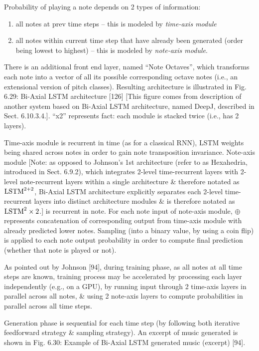 \documentclass{article}
\begin{document}
\begin{itemize}
\begin{itemize}
\begin{itemize}
			Probability of playing a note depends on 2 types of information:
			\begin{enumerate}
				\item all notes at prev time steps -- this is modeled by {\it time-axis module}
				\item all notes within current time step that have already been generated (order being lowest to highest) -- this is modeled by {\it note-axis module}.
			\end{enumerate}
			There is an additional front end layer, named ``Note Octaves'', which transforms each note into a vector of all its possible corresponding octave notes (i.e., an extensional version of pitch classes). Resulting architecture is illustrated in {\sf Fig. 6.29: Bi-Axial LSTM architecture [126]} [This figure comes from description of another system based on Bi-Axial LSTM architecture, named DeepJ, described in Sect. 6.10.3.4.]. ``x2'' represents fact: each module is stacked twice (i.e., has 2 layers).
			
			Time-axis module is recurrent in time (as for a classical RNN), LSTM weights being shared across notes in order to gain note transposition invariance. Note-axis module [Note: as opposed to {\sc Johnson}'s 1st architecture (refer to as Hexahedria, introduced in Sect. 6.9.2), which integrates 2-level time-recurrent layers with 2-level note-recurrent layers within a single architecture \& therefore notated as ${\rm LSTM}^{2+2}$, Bi-Axial LSTM architecture explicitly separates each 2-level time-recurrent layers into distinct architecture modules \& is therefore notated as ${\rm LSTM}^2\times2$.] is recurrent in note. For each note input of note-axis module, $\oplus$ represents concatenation of corresponding output from time-axis module with already predicted lower notes. Sampling (into a binary value, by using a coin flip) is applied to each note output probability in order to compute final prediction (whether that note is played or not).
			
			As pointed out by Johnson [94], during training phase, as all notes at all time steps are known, training process may be accelerated by processing each layer independently (e.g., on a GPU), by running input through 2 time-axis layers in parallel across all notes, \& using 2 note-axis layers to compute probabilities in parallel across all time steps.
			
			Generation phase is sequential for each time step (by following both iterative feedforward strategy \& sampling strategy). An excerpt of music generated is shown in {\sf Fig. 6.30: Example of Bi-Axial LSTM generated music (excerpt) [94].}
			

\end{itemize}
\end{itemize}
\end{itemize}
\end{document}

